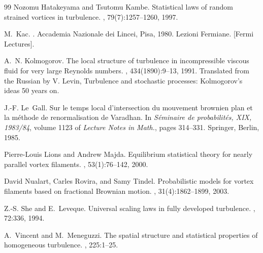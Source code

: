 \documentclass[a4paper,12pt]{article}
\begin{document}
\begin{thebibliography}{99}
Nozomu Hatakeyama and Tsutomu Kambe. \newblock Statistical
laws of random strained vortices in turbulence. , 79(7):1257--1260, 1997.

M.~Kac. . \newblock
Accademia Nazionale dei Lincei, Pisa, 1980. \newblock Lezioni Fermiane. [Fermi Lectures].

A.~N. Kolmogorov. \newblock The local structure of turbulence in
incompressible viscous fluid for very large {R}eynolds numbers. , 434(1890):9--13, 1991. \newblock Translated
from the Russian by V. Levin, Turbulence and stochastic processes:
Kolmogorov's ideas 50 years on.

J.-F. Le~Gall. \newblock Sur le temps local d'intersection du
mouvement brownien plan et la m\'{e}thode de renormalisation de {V}aradhan.
\newblock In \emph{S\'{e}minaire de probabilit\'{e}s, XIX, 1983/84}, volume
1123 of \emph{Lecture Notes in Math.}, pages 314--331. Springer, Berlin, 1985.

Pierre-Louis Lions and Andrew Majda. \newblock
Equilibrium statistical theory for nearly parallel vortex filaments.
, 53(1):76--142, 2000.

David Nualart, Carles Rovira, and Samy Tindel. \newblock
Probabilistic models for vortex filaments based on fractional {B}rownian
motion. , 31(4):1862--1899, 2003.

Z.-S. She and E.~Leveque. \newblock Universal scaling laws in
fully developed turbulence. , 72:336, 1994.

A.~Vincent and M.~Meneguzzi. \newblock The spatial
structure and statistical properties of homogeneous turbulence. , 225:1--25.
\end{thebibliography}
\end{document}
